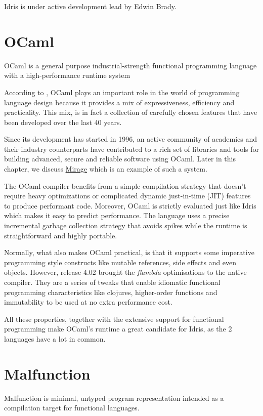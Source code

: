 Idris is under active development lead by Edwin Brady.

\section{OCaml}
OCaml is a general purpose industrial-strength functional
programming language with a high-performance runtime system

According to \citep{rwocaml}, OCaml plays an important role in the
world of programming language design because it provides a mix
of expressiveness, efficiency and practicality.
This mix, is in fact a collection of carefully chosen features
that have been developed over the last 40 years.

Since its development has started in 1996, an active community of
academics and their industry counterparts have contributed to a rich set of
libraries and tools for building advanced, secure and reliable software
using OCaml.
Later in this chapter, we discuss \hyperref[sec:mirage]{Mirage} which is
an example of such a system.

The OCaml compiler benefits from a simple
compilation strategy that doesn't require heavy optimizations or
complicated dynamic just-in-time (JIT) features to produce performant
code. Moreover, OCaml is strictly evaluated just like Idris which
makes it easy to predict performance.
The language uses  a precise incremental garbage collection strategy
that avoids spikes while the runtime is straightforward and highly
portable.

Normally, what also makes OCaml practical, is that it supports some
imperative programming style constructs like mutable references,
side effects and even objects.
However, release 4.02 brought the \emph{flambda} optimisations to the
native compiler. They are a series of tweaks
that enable idiomatic functional programming characteristics like clojures,
higher-order functions and immutability to be used at no extra
performance cost.\citep{leroy2014ocaml}

All these properties, together with the extensive support
for functional programming make OCaml's runtime a great
candidate for Idris, as the 2 languages have a lot in common.

\section{Malfunction}
Malfunction is minimal, untyped program representation intended as a
compilation target for functional languages.

